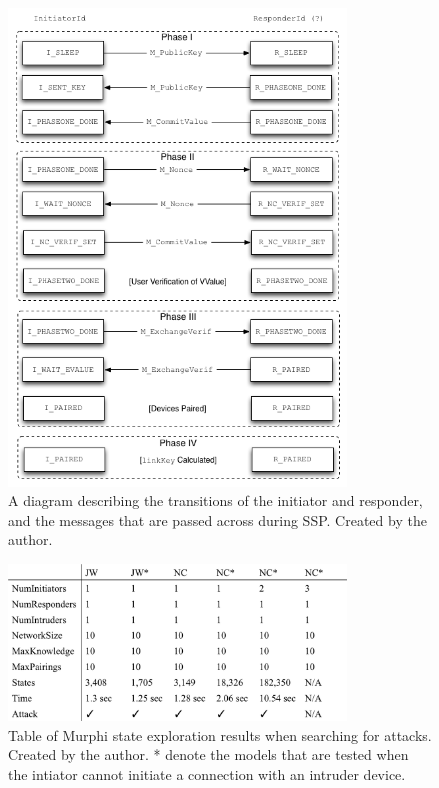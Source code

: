 \documentclass{acm_proc_article-sp}
\begin{document}
\begin{figure}
    \begin{center}
        \includegraphics[width=0.8\textwidth]{diagrams/transitions.png}
        \caption{A diagram describing the transitions of the initiator and responder, and the messages that are passed across during SSP. Created by the author.}
        \label{transitions}
    \end{center}
\end{figure}

\begin{figure}
    \begin{center}
        \includegraphics[width=0.8\textwidth]{diagrams/state_table.png}
        \caption{Table of Murphi state exploration results when searching for attacks. Created by the author. * denote the models that are tested when the intiator cannot initiate a connection with an intruder device.}
        \label{state_table}
    \end{center}
\end{figure}
\end{document}
